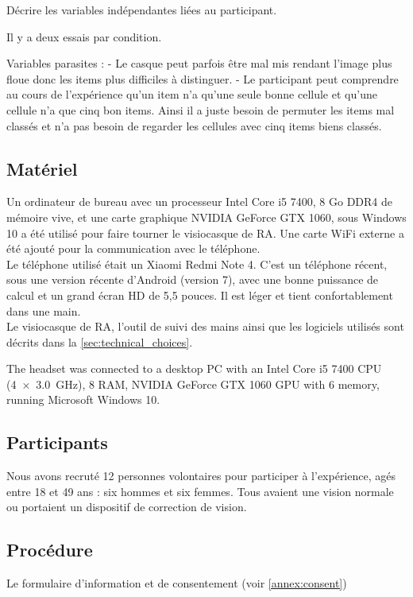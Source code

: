 Décrire les variables indépendantes liées au participant.

Il y a deux essais par condition.

Variables parasites : 
- Le casque peut parfois être mal mis rendant l'image plus floue donc les items plus difficiles à distinguer.
- Le participant peut comprendre au cours de l'expérience qu'un item n'a qu'une seule bonne cellule et qu'une cellule n'a que cinq bon items. Ainsi il a juste besoin de permuter les items mal classés et n'a pas besoin de regarder les cellules avec cinq items biens classés. 

\subsection{Matériel}
Un ordinateur de bureau avec un processeur Intel Core i5 7400, 8 Go DDR4 de mémoire vive, et une carte graphique NVIDIA GeForce GTX 1060, sous Windows 10 a été utilisé pour faire tourner le visiocasque de RA. Une carte WiFi externe a été ajouté pour la communication avec le téléphone.\\
Le téléphone utilisé était un Xiaomi Redmi Note 4. C'est un téléphone récent, sous une version récente d'Android (version 7), avec une bonne puissance de calcul et un grand écran HD de 5,5 pouces. Il est léger et tient confortablement dans une main.\\
Le visiocasque de RA, l'outil de suivi des mains ainsi que les logiciels utilisés sont décrits dans la \autoref{sec:technical_choices}.

The headset was connected to a desktop PC with an Intel Core i5 7400 CPU (\SI[product-units = single]{4x3.0}{\GHz}), \SI{8}{\GB} RAM, NVIDIA GeForce GTX 1060 GPU with \SI{6}{\GB} memory, running Microsoft Windows 10.

\subsection{Participants}
Nous avons recruté 12 personnes volontaires pour participer à l'expérience, agés entre 18 et 49 ans : six hommes et six femmes. Tous avaient une vision normale ou portaient un dispositif de correction de vision.

\subsection{Procédure}
Le formulaire d'information et de consentement (voir \autoref{annex:consent})

